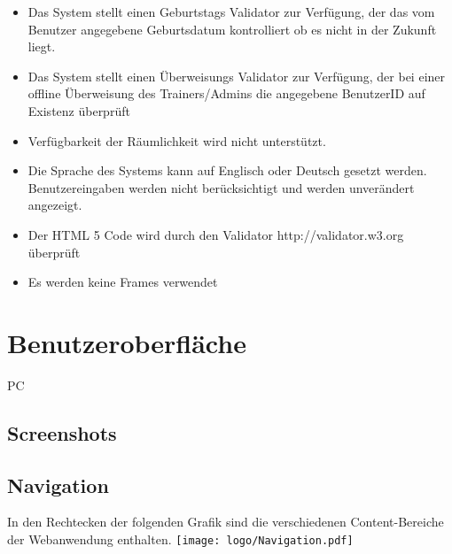 \documentclass[a4paper]{scrreprt}
\begin{document}
\begin{itemize}
	\item \Func{} Das System stellt einen Geburtstags Validator zur Verfügung, der das vom Benutzer angegebene Geburtsdatum kontrolliert ob es nicht in der Zukunft liegt. 
	\item \Func{} Das System stellt einen Überweisungs Validator zur Verfügung, der bei einer offline Überweisung des Trainers/Admins die angegebene BenutzerID auf Existenz überprüft  
	\item \Func{} Verfügbarkeit der Räumlichkeit wird nicht unterstützt.
	\item \Func{} Die Sprache des Systems kann auf Englisch oder Deutsch gesetzt werden. Benutzereingaben werden nicht berücksichtigt und werden unverändert angezeigt.
	\item Der HTML 5 Code wird durch den Validator http://validator.w3.org überprüft
	\item Es werden keine Frames verwendet
\end{itemize}

		
		
 
\chapter{Benutzeroberfläche}
	\begin{tiny}
		PC
	\end{tiny}
   
    \section{Screenshots}
    
	    \subsection{}
    
	    \subsection{}
    
    \section{Navigation}
	    In den Rechtecken der folgenden Grafik sind die verschiedenen Content-Bereiche der Webanwendung enthalten.
		    \newline
		    \newline
			    \texttt{[image: logo/Navigation.pdf]}
		    \newline
    
\end{document}

